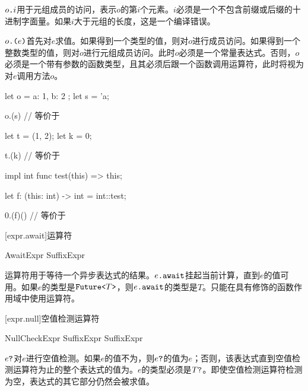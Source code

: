 \pnum
$o\texttt{.}i$用于元组成员的访问，表示$o$的第$i$个元素。$i$必须是一个不包含前缀或后缀的十进制字面量。如果$i$大于元组的长度，这是一个编译错误。

\pnum
$o\texttt{.(}e\texttt{)}$首先对$e$求值。如果得到一个类型的值，则对$o$进行成员访问。如果得到一个整数类型的值，则对$o$进行元组成员访问。此时$o$必须是一个常量表达式。否则，$o$必须是一个带有参数的函数类型，且其必须后跟一个函数调用运算符，此时将视为对$e$调用方法$o$。

\enterexample
\begin{codeblock}
let o = { a: 1, b: 2 };
let s = 'a;

o.(s) // 等价于

let t = (1, 2);
let k = 0;

t.(k) // 等价于

impl int {
    func test(this) => this;
}

let f: (this: int) -> int = int::test;

0.(f)() // 等价于
\end{codeblock}
\exitexample

[expr.await]{运算符}

\begin{bnf}{AwaitExpr}
    SuffixExpr  
\end{bnf}

\pnum
{}运算符用于等待一个异步表达式的结果。$e\texttt{.await}$挂起当前计算，直到$e$的值可用。如果$e$的类型是$\texttt{Future<}T\texttt{>}$，则$e\texttt{.await}$的类型是$T$。只能在具有修饰的函数作用域中使用运算符。

[expr.null]{空值检测运算符}

\begin{bnf}{NullCheckExpr}
    SuffixExpr  \br
    SuffixExpr \terminal{!}
\end{bnf}

\pnum
$e\texttt{?}$对$e$进行空值检测。如果$e$的值不为，则$e\texttt{?}$的值为$e$；否则，该表达式直到空值检测运算符为止的整个表达式的值为。$e$的类型必须是$T\texttt{?}$。即使空值检测运算符检测为空，表达式的其它部分仍然会被求值。

